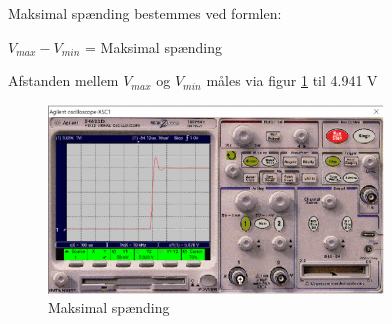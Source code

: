 Maksimal spænding bestemmes ved formlen:
\begin{center}
$V_{max} - V_{min}$ = Maksimal spænding
\end{center}

Afstanden mellem $V_{max}$ og $V_{min}$ måles via figur \ref{10k_max} til 4.941 V

\begin{figure}[h]
 \begin{center}
  \includegraphics[height=5cm]{P_Fig/figur9_1k_max}
  \caption{Maksimal spænding}
  \label{10k_max}
 \end{center}
\end{figure}